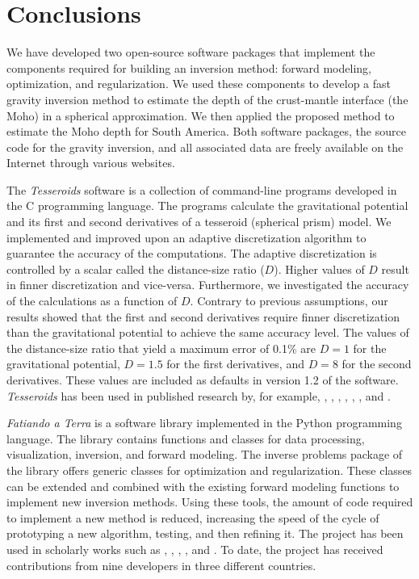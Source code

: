 \chapter{Conclusions}


We have developed two open-source software packages that implement the
components required for building an inversion method: forward modeling,
optimization, and regularization.
We used these components to develop a fast gravity inversion method to estimate
the depth of the crust-mantle interface (the Moho) in a spherical
approximation.
We then applied the proposed method to estimate the Moho depth for South
America.
Both software packages, the source code for the gravity inversion, and all
associated data are freely available on the Internet through various websites.

The \textit{Tesseroids} software is a collection of command-line
programs developed in the C programming language.
The programs calculate the gravitational potential and its first and second
derivatives of a tesseroid (spherical prism) model.
We implemented and improved upon an adaptive discretization algorithm to
guarantee the accuracy of the computations.
The adaptive discretization is controlled by a scalar called the distance-size
ratio ($D$).
Higher values of $D$ result in finner discretization and vice-versa.
Furthermore, we investigated the accuracy of the calculations as a function of
$D$.
Contrary to previous assumptions, our results showed that the first and second
derivatives require finner discretization than the gravitational potential to
achieve the same accuracy level.
The values of the distance-size ratio that yield a maximum error of 0.1\%
are $D = 1$ for the gravitational potential, $D = 1.5$ for the first
derivatives, and $D = 8$ for the second derivatives.
These values are included as defaults in version 1.2 of the software.
\textit{Tesseroids} has been used in published research by, for example,
\citet{braitenberg2011}, \citet{alvarez2012}, \citet{bouman2013},
\citet{bouman2013a}, \citet{mariani2013}, \citet{braitenberg2015}, and
\citet{fullea2015a}.

\textit{Fatiando a Terra} is a software library implemented in the Python
programming language.
The library contains functions and classes for data processing, visualization,
inversion, and forward modeling.
The inverse problems package of the library offers generic classes for
optimization and regularization.
These classes can be extended and combined with the existing forward modeling
functions to implement new inversion methods.
Using these tools, the amount of code required to implement a new method is
reduced, increasing the speed of the cycle of prototyping a new algorithm,
testing, and then refining it.
The project has been used in scholarly works such as
\citet{carlos2014}, \citet{hidalgo-gato2015a}, \citet{niccoli2015},
\citet{oliveirajr.2015}, and \citet{bassett2016}.
To date, the project has received contributions from nine developers in three
different countries.

